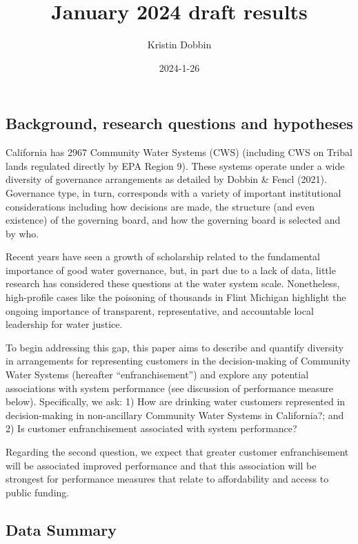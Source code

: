 \documentclass[
]{article}
\title{January 2024 draft results}
\author{Kristin Dobbin}
\date{2024-1-26}
\begin{document}
\maketitle

\hypertarget{background-research-questions-and-hypotheses}{%
\subsection{Background, research questions and
hypotheses}\label{background-research-questions-and-hypotheses}}

California has 2967 Community Water Systems (CWS) (including CWS on
Tribal lands regulated directly by EPA Region 9). These systems operate
under a wide diversity of governance arrangements as detailed by Dobbin
\& Fencl (2021). Governance type, in turn, corresponds with a variety of
important institutional considerations including how decisions are made,
the structure (and even existence) of the governing board, and how the
governing board is selected and by who.

Recent years have seen a growth of scholarship related to the
fundamental importance of good water governance, but, in part due to a
lack of data, little research has considered these questions at the
water system scale. Nonetheless, high-profile cases like the poisoning
of thousands in Flint Michigan highlight the ongoing importance of
transparent, representative, and accountable local leadership for water
justice.

To begin addressing this gap, this paper aims to describe and quantify
diversity in arrangements for representing customers in the
decision-making of Community Water Systems (hereafter
``enfranchisement'') and explore any potential associations with system
performance (see discussion of performance measure below). Specifically,
we ask: 1) How are drinking water customers represented in
decision-making in non-ancillary Community Water Systems in California?;
and 2) Is customer enfranchisement associated with system performance?

Regarding the second question, we expect that greater customer
enfranchisement will be associated improved performance and that this
association will be strongest for performance measures that relate to
affordability and access to public funding.

\hypertarget{data-summary}{%
\subsection{Data Summary}\label{data-summary}}
\end{document}
